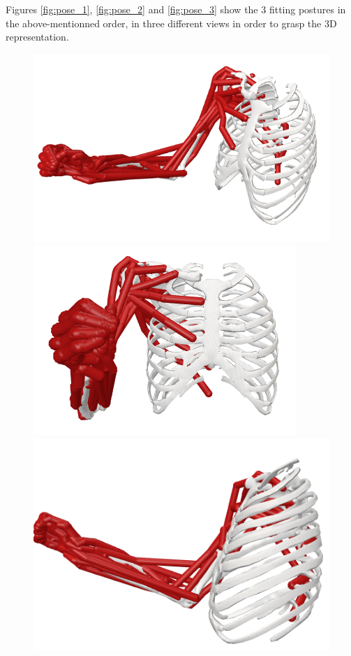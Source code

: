 Figures \ref{fig:pose_1}, \ref{fig:pose_2} and \ref{fig:pose_3} show the 3 fitting postures in the above-mentionned order, in three different views in order to grasp the 3D representation.
\begin{figure}[!htb]
    \centering
    \captionsetup{justification=centering}
    \begin{minipage}{0.3\linewidth}
        \centering
        \includegraphics[trim={0 0 0 0}, clip, width=0.95\linewidth]{img/chapter_4/pose_1_view.png}
    \end{minipage}
    \hfill
    \begin{minipage}{0.3\linewidth}
        \captionsetup{justification=centering}
        \centering
        \includegraphics[trim={0 0 0 0}, clip, width=0.75\linewidth]{img/chapter_4/pose_1_front.png}
    \end{minipage}
    \hfill
    \begin{minipage}{0.3\linewidth}
        \captionsetup{justification=centering}
        \centering
        \includegraphics[trim={0 0 0 0}, clip, width=0.8\linewidth]{img/chapter_4/pose_1_side.png}

\end{minipage}
\end{figure}
